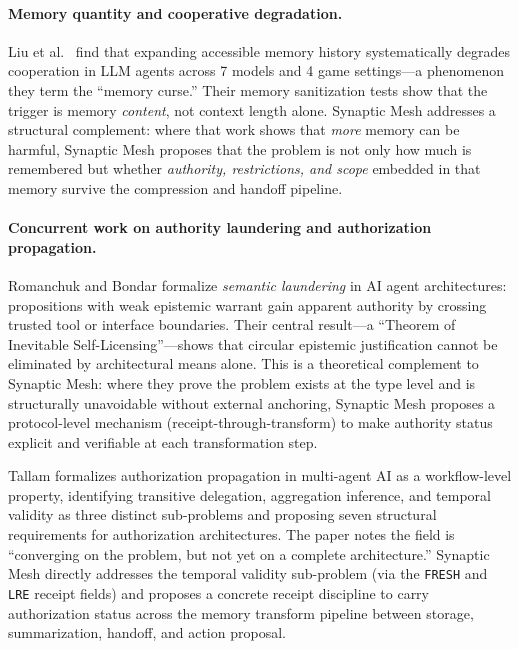 \documentclass[11pt]{article}
\begin{document}
\paragraph{Memory quantity and cooperative degradation.}
Liu et al.~\cite{R19_Liu2026_MemoryCurse} find that expanding accessible memory
history systematically degrades cooperation in LLM agents across 7 models and 4
game settings---a phenomenon they term the ``memory curse.'' Their memory sanitization
tests show that the trigger is memory \emph{content}, not context length alone.
Synaptic Mesh addresses a structural complement: where that work shows that \emph{more}
memory can be harmful, Synaptic Mesh proposes that the problem is not only how much is
remembered but whether \emph{authority, restrictions, and scope} embedded in that
memory survive the compression and handoff pipeline.

\paragraph{Concurrent work on authority laundering and authorization propagation.}
Romanchuk and Bondar \cite{R20_Romanchuk2026_SemanticLaundering} formalize
\emph{semantic laundering} in AI agent architectures: propositions with weak
epistemic warrant gain apparent authority by crossing trusted tool or interface
boundaries. Their central result---a ``Theorem of Inevitable Self-Licensing''---shows
that circular epistemic justification cannot be eliminated by architectural means
alone. This is a theoretical complement to Synaptic Mesh: where they prove the
problem exists at the type level and is structurally unavoidable without external
anchoring, Synaptic Mesh proposes a protocol-level mechanism (receipt-through-transform)
to make authority status explicit and verifiable at each transformation step.

Tallam \cite{R22_Tallam2026_AuthorizationPropagation} formalizes authorization
propagation in multi-agent AI as a workflow-level property, identifying transitive
delegation, aggregation inference, and temporal validity as three distinct
sub-problems and proposing seven structural requirements for authorization
architectures. The paper notes the field is ``converging on the problem, but not yet
on a complete architecture.'' Synaptic Mesh directly addresses the temporal validity
sub-problem (via the \texttt{FRESH} and \texttt{LRE} receipt fields) and proposes
a concrete receipt discipline to carry authorization status across the memory transform
pipeline between storage, summarization, handoff, and action proposal.
\end{document}
